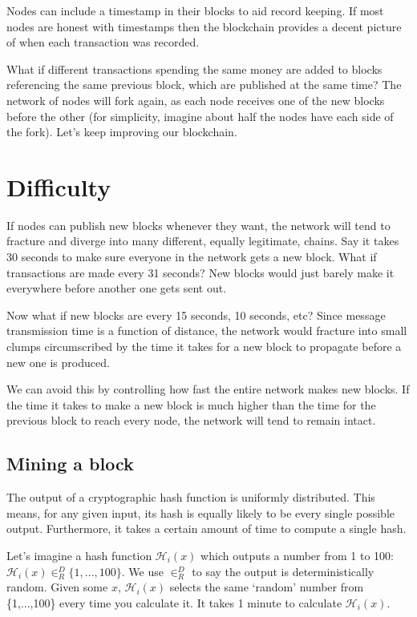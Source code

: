 Nodes can include a timestamp in their blocks to aid record keeping. If most nodes are honest with timestamps then the blockchain provides a decent picture of when each transaction was recorded.

What if different transactions spending the same money are added to blocks referencing the same previous block, which are published at the same time? The network of nodes will fork again, as each node receives one of the new blocks before the other (for simplicity, imagine about half the nodes have each side of the fork). Let's keep improving our blockchain.


\section{Difficulty}
\label{sec:difficulty}

If nodes can publish new blocks whenever they want, the network will tend to fracture and diverge into many different, equally legitimate, chains. Say it takes 30 seconds to make sure everyone in the network gets a new block. What if transactions are made every 31 seconds? New blocks would just barely make it everywhere before another one gets sent out. 

Now what if new blocks are every 15 seconds, 10 seconds, etc? Since message transmission time is a function of distance, the network would fracture into small clumps circumscribed by the time it takes for a new block to propagate before a new one is produced.

We can avoid this by controlling how fast the entire network makes new blocks. If the time it takes to make a new block is much higher than the time for the previous block to reach every node, the network will tend to remain intact.


\subsection{Mining a block}

The output of a cryptographic hash function is uniformly distributed. This means, for any given input, its hash is equally likely to be every single possible output. Furthermore, it takes a certain amount of time to compute a single hash.

Let's imagine a hash function $\mathcal{H}_i(x)$ which outputs a number from 1 to 100: $\mathcal{H}_i(x) \in^D_R \{1,...,100\}$. We use $\in^D_R$ to say the output is deterministically random. Given some $x$, $\mathcal{H}_i(x)$ selects the same `random' number from \{1,...,100\} every time you calculate it. It takes 1 minute to calculate $\mathcal{H}_i(x)$. 

